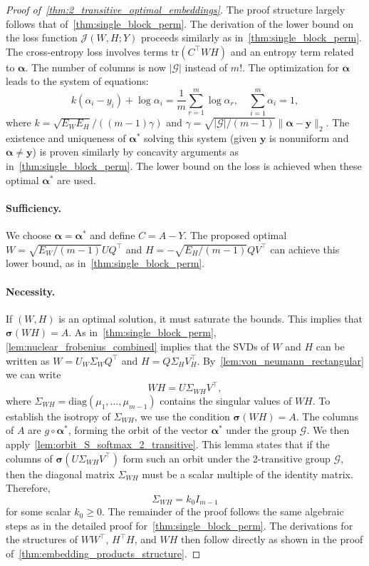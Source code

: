 \documentclass[11pt]{article}
\begin{document}
\begin{proof}[Proof of~\cref{thm:2_transitive_optimal_embeddings}]
The proof structure largely follows that of~\cref{thm:single_block_perm}.
The derivation of the lower bound on the loss function \(\mathcal J(W,H;Y)\) proceeds similarly as in~\cref{thm:single_block_perm}. The cross-entropy loss involves terms \(\mathrm{tr}(C ^\top WH)\) and an entropy term related to \(\boldsymbol{\alpha}\). The number of columns is now \(|\mathcal G|\) instead of \(m!\).
The optimization for \(\boldsymbol{\alpha}\) leads to the system of equations:
\[ k (\alpha_i-y_i) + \log\alpha_i = \frac{1}{m}\sum_{r=1}^m\log\alpha_r, \quad \sum_{i=1}^m \alpha_i=1, \]
where \(k  = \sqrt{E_W E_H}/((m-1)\gamma) \) and \(\gamma  = \sqrt{|\mathcal G|/(m-1)}\|\boldsymbol{\alpha}-\boldsymbol{y}\|_2\). The existence and uniqueness of \(\boldsymbol{\alpha}^*\) solving this system (given \(\boldsymbol{y}\) is nonuniform and \(\boldsymbol{\alpha}\neq \boldsymbol{y}\)) is proven similarly by concavity arguments as in~\cref{thm:single_block_perm}. The lower bound on the loss is achieved when these optimal \(\boldsymbol{\alpha}^*\) are used.

\paragraph{Sufficiency.}
We choose \(\boldsymbol{\alpha}=\boldsymbol{\alpha}^*\) and define \(C =A-Y \). The proposed optimal \(W=\sqrt{E_W/(m-1)}UQ^\top\) and \(H=-\sqrt{E_H/(m-1)}QV^\top\) can achieve this lower bound, as in~\cref{thm:single_block_perm}.

\paragraph{Necessity.}
If \((W,H)\) is an optimal solution, it must saturate the bounds. This implies that \(\boldsymbol{\sigma}(WH)=A\). As in~\cref{thm:single_block_perm}, \cref{lem:nuclear_frobenius_combined} implies that the SVDs of \(W\) and \(H\) can be written as \(W=U_W\Sigma_W Q^\top\) and \(H=Q\Sigma_H V_H^\top\).
By~\cref{lem:von_neumann_rectangular} we can write
\[ WH = U\Sigma_{WH}V^\top, \]
where \(\Sigma_{WH} = \mathrm{diag}(\mu_1, \dots, \mu_{m-1})\) contains the singular values of \(WH\).
To establish the isotropy of \(\Sigma_{WH}\), we use the condition \(\boldsymbol{\sigma}(WH)=A\). The columns of \(A\) are \(g\circ\boldsymbol{\alpha}^*\), forming the orbit of the vector \(\boldsymbol{\alpha}^*\) under the group \(\mathcal G\). We then apply~\cref{lem:orbit_S_softmax_2_transitive}. This lemma states that if the columns of \(\boldsymbol{\sigma}(U\Sigma_{WH}V^\top)\) form such an orbit under the 2-transitive group \(\mathcal G\), then the diagonal matrix \(\Sigma_{WH}\) must be a scalar multiple of the identity matrix. Therefore,
\[ \Sigma_{WH} = k_0 I_{m-1} \]
for some scalar \(k_0 \ge 0\). The remainder of the proof follows the same algebraic steps as in the detailed proof for~\cref{thm:single_block_perm}. The derivations for the structures of \(WW^\top\), \(H^\top H\), and \(WH\) then follow directly as shown in the proof of~\cref{thm:embedding_products_structure}.
\end{proof}
\end{document}

